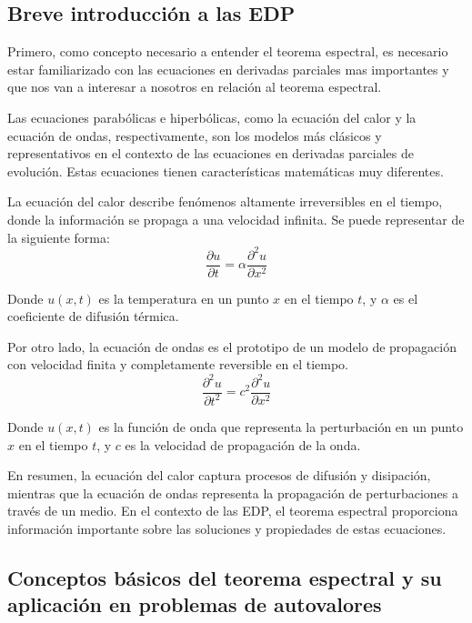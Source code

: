 \documentclass{article}
\begin{document}
    \subsection{Breve introducción a las EDP}
    Primero, como concepto necesario a entender el teorema espectral, es necesario estar familiarizado con las ecuaciones en derivadas parciales mas importantes y que nos van a interesar a nosotros en relación al teorema espectral.

    Las ecuaciones parabólicas e hiperbólicas, como la ecuación del calor y la ecuación de ondas, respectivamente, son los modelos más clásicos y representativos en el contexto de las ecuaciones en derivadas parciales de evolución. Estas ecuaciones tienen características matemáticas muy diferentes. 

    La ecuación del calor describe fenómenos altamente irreversibles en el tiempo, donde la información se propaga a una velocidad infinita. Se puede representar de la siguiente forma:
    \begin{equation}
        \frac{\partial u}{\partial t} = \alpha \frac{\partial^2 u}{\partial x^2}
        \end{equation}
    
        Donde $u(x,t)$ es la temperatura en un punto $x$ en el tiempo $t$, y $\alpha$ es el coeficiente de difusión térmica.

    Por otro lado, la ecuación de ondas es el prototipo de un modelo de propagación con velocidad finita y completamente reversible en el tiempo.
    \begin{equation}
        \frac{\partial^2 u}{\partial t^2} = c^2 \frac{\partial^2 u}{\partial x^2}
        \end{equation}
        
        Donde $u(x,t)$ es la función de onda que representa la perturbación en un punto $x$ en el tiempo $t$, y $c$ es la velocidad de propagación de la onda.

    En resumen, la ecuación del calor captura procesos de difusión y disipación, mientras que la ecuación de ondas representa la propagación de perturbaciones a través de un medio. En el contexto de las EDP, el teorema espectral proporciona información importante sobre las soluciones y propiedades de estas ecuaciones.
    \subsection{Conceptos básicos del teorema espectral y su aplicación en problemas de autovalores}
\end{document}
